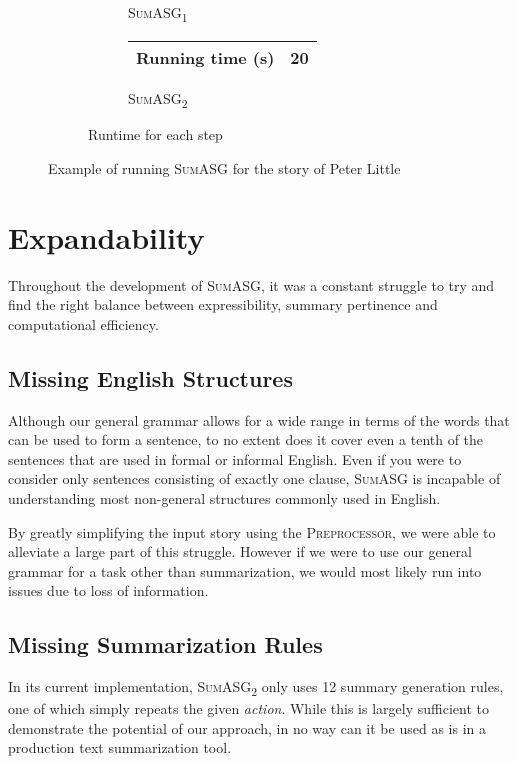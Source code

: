 \begin{figure}[H]
\begin{subfigure}{\textwidth}
\begin{subfigure}{0.5\textwidth}
\begin{tabular}{@{}lllllll@{}}
\end{tabular}
\caption{\textsc{SumASG\textsubscript{1}}}
\end{subfigure}
\begin{subfigure}{0.5\textwidth}
\renewcommand\thesubfigure{\roman{subfigure}}
\centering
\begin{tabular}{@{}ll@{}}
\toprule
Running time (s) & 20 \\ \bottomrule
\end{tabular}
\caption{\textsc{SumASG\textsubscript{2}}}
\end{subfigure}
\setcounter{subfigure}{2}
\caption{Runtime for each step}
\end{subfigure}
\caption{Example of running \textsc{SumASG} for the story of Peter Little}
\label{fig:sumasg_example}
\end{figure}

\section{Expandability}

Throughout the development of \textsc{SumASG}, it was a constant struggle to try and find the right balance between expressibility, summary pertinence and computational efficiency.

\subsection{Missing English Structures}

Although our general grammar allows for a wide range in terms of the words that can be used to form a sentence, to no extent does it cover even a tenth of the sentences that are used in formal or informal English. Even if you were to consider only sentences consisting of exactly one clause, \textsc{SumASG} is incapable of understanding most non-general structures commonly used in English.

By greatly simplifying the input story using the \textsc{Preprocessor}, we were able to alleviate a large part of this struggle. However if we were to use our general grammar for a task other than summarization, we would most likely run into issues due to loss of information.

\subsection{Missing Summarization Rules}

In its current implementation, \textsc{SumASG\textsubscript{2}} only uses 12 summary generation rules, one of which simply repeats the given \textit{action}. While this is largely sufficient to demonstrate the potential of our approach, in no way can it be used as is in a production text summarization tool.

